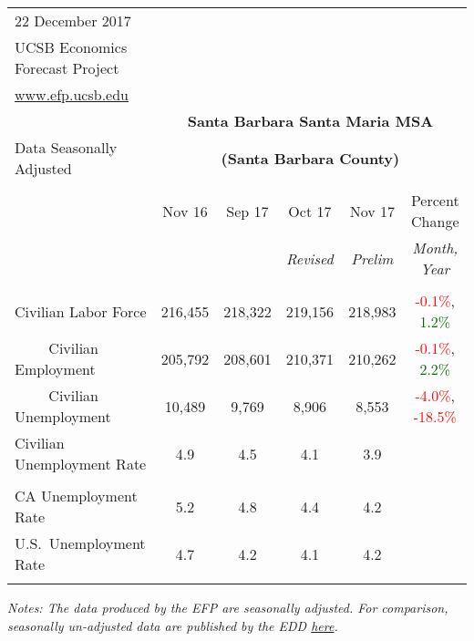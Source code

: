 \documentclass[12pt]{article}
\begin{document}
\begin{table}
\begin{tabular}{|l|c|c|c|c|c|}
\multicolumn{1}{l}{\small 22 December 2017} & \multicolumn{5}{c}{} \\
\multicolumn{1}{l}{\small UCSB Economics Forecast Project} & \multicolumn{5}{c}{} \\
\multicolumn{1}{l}{\small \href{http://www.efp.ucsb.edu/}{www.efp.ucsb.edu}} & \multicolumn{5}{c}{} \\
\multicolumn{1}{c}{} & \multicolumn{5}{c}{\large \textbf{Santa Barbara Santa Maria MSA}} \\
\multicolumn{1}{l}{\small Data Seasonally Adjusted} & \multicolumn{5}{c}{\small \textbf{(Santa Barbara County)}} \\ \hline \hline
& & & & & \\
 & Nov 16 & Sep 17 & Oct 17 & Nov 17 & Percent Change \\
 & & & \small \textit{Revised} & \small \textit{Prelim} & \small \textit{Month, Year} \\ \hline
& & & & & \\
Civilian Labor Force & 216,455 & 218,322 & 219,156 & 218,983 & \textcolor{red}{-0.1\%}, \textcolor{darkgreen}{1.2\%} \\
$\qquad$ \small Civilian Employment & 205,792 & 208,601 & 210,371 & 210,262 & \textcolor{red}{-0.1\%}, \textcolor{darkgreen}{2.2\%} \\
$\qquad$ \small Civilian Unemployment & 10,489 & 9,769 & 8,906 & 8,553 & \textcolor{red}{-4.0\%}, \textcolor{red}{-18.5\%} \\
Civilian Unemployment Rate & 4.9 & 4.5 & 4.1 & 3.9 & \\
& & & & & \\
CA Unemployment Rate & 5.2 & 4.8 & 4.4 & 4.2 & \\
U.S.\ Unemployment Rate & 4.7 & 4.2 & 4.1 & 4.2 & \\
& & & & & \\ \hline \hline
\end{tabular}
\par
\vspace{.5em}
\footnotesize
\textit{Notes: The data produced by the EFP are seasonally adjusted. For comparison, seasonally un-adjusted data are published by the EDD \href{http://www.labormarketinfo.ca.gov/file/lfmonth/satb$pds.pdf}{here}.}
\end{table}
\end{document}
